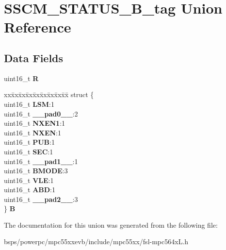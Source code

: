 \hypertarget{unionSSCM__STATUS__16B__tag}{}\section{S\+S\+C\+M\+\_\+\+S\+T\+A\+T\+U\+S\+\_\+B\+\_\+tag Union Reference}
\label{unionSSCM__STATUS__16B__tag}
\subsection*{Data Fields}
\begin{DoxyCompactItemize}
\item 
\mbox{\label{unionSSCM__STATUS__16B__tag_a99223068ec19f9fde7c66f48a59f9902}} 
uint16\+\_\+t {\bfseries R}
\item 
\mbox{\label{unionSSCM__STATUS__16B__tag_aec8c240799fcb27c202b16dbf061520f}} 
\begin{tabbing}
xx\=xx\=xx\=xx\=xx\=xx\=xx\=xx\=xx\=\kill
struct \{\\
\>uint16\_t {\bfseries LSM}:1\\
\>uint16\_t {\bfseries \_\_pad0\_\_}:2\\
\>uint16\_t {\bfseries NXEN1}:1\\
\>uint16\_t {\bfseries NXEN}:1\\
\>uint16\_t {\bfseries PUB}:1\\
\>uint16\_t {\bfseries SEC}:1\\
\>uint16\_t {\bfseries \_\_pad1\_\_}:1\\
\>uint16\_t {\bfseries BMODE}:3\\
\>uint16\_t {\bfseries VLE}:1\\
\>uint16\_t {\bfseries ABD}:1\\
\>uint16\_t {\bfseries \_\_pad2\_\_}:3\\
\} {\bfseries B}\\

\end{tabbing}\end{DoxyCompactItemize}


The documentation for this union was generated from the following file\+:\begin{DoxyCompactItemize}
\item 
bsps/powerpc/mpc55xxevb/include/mpc55xx/fsl-\/mpc564x\+L.\+h\end{DoxyCompactItemize}
